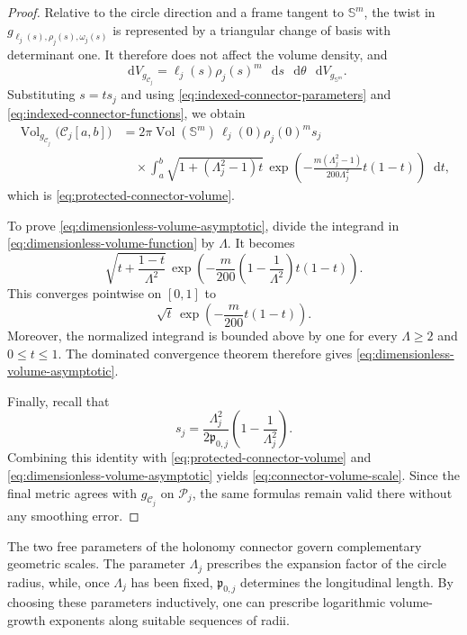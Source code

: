 \documentclass[11pt,reqno]{amsart}
\theoremstyle{definition}
\numberwithin{equation}{section}
\newcommand{\dd}{\mathop{}\!\mathrm d}
\begin{document}
\begin{proof}
Relative to the circle direction and a frame tangent to
$\mathbb S^m$, the twist in
$g_{\ell_j(s),\rho_j(s),\omega_j(s)}$ is represented by a triangular
change of basis with determinant one.  It therefore does not affect the
volume density, and
\[
 \dd V_{g_{\mathcal C_j}}
 =
 \ell_j(s)\rho_j(s)^m\,
 \dd s\,\dd\theta\,\dd V_{g_{\mathbb S^m}}.
\]
Substituting $s=ts_j$ and using
\eqref{eq:indexed-connector-parameters} and
\eqref{eq:indexed-connector-functions}, we obtain
\[
 \begin{aligned}
 \operatorname{Vol}_{g_{\mathcal C_j}}
 \bigl(\mathcal C_j[a,b]\bigr)
 &=
 2\pi\operatorname{Vol}(\mathbb S^m)\,
 \ell_j(0)\rho_j(0)^m s_j\\
 &\quad\times
 \int_a^b
 \sqrt{1+(\Lambda_j^2-1)t}\,
 \exp\left(
   -\frac{m(\Lambda_j^2-1)}{200\Lambda_j^2}t(1-t)
 \right)\dd t,
 \end{aligned}
\]
which is \eqref{eq:protected-connector-volume}.

To prove \eqref{eq:dimensionless-volume-asymptotic}, divide the
integrand in \eqref{eq:dimensionless-volume-function} by $\Lambda$.
It becomes
\[
 \sqrt{
   t+\frac{1-t}{\Lambda^2}
 }\,
 \exp\left(
   -\frac{m}{200}
   \left(1-\frac1{\Lambda^2}\right)t(1-t)
 \right).
\]
This converges pointwise on $[0,1]$ to
\[
 \sqrt t\,
 \exp\left(-\frac{m}{200}t(1-t)\right).
\]
Moreover, the normalized integrand is bounded above by one for every
$\Lambda\ge2$ and $0\le t\le1$.  The dominated convergence theorem
therefore gives
\eqref{eq:dimensionless-volume-asymptotic}.

Finally, recall that
\[
 s_j
 =
 \frac{\Lambda_j^2}{2\mathfrak p_{0,j}}
 \left(1-\frac1{\Lambda_j^2}\right).
\]
Combining this identity with
\eqref{eq:protected-connector-volume} and
\eqref{eq:dimensionless-volume-asymptotic} yields
\eqref{eq:connector-volume-scale}.  Since the final metric agrees with
$g_{\mathcal C_j}$ on $\mathcal P_j$, the same formulas
remain valid there without any smoothing error.
\end{proof}

The two free parameters of the holonomy connector govern complementary geometric
scales.  The parameter \(\Lambda_j\) prescribes the expansion factor of
the circle radius, while, once \(\Lambda_j\) has been fixed,
\(\mathfrak p_{0,j}\) determines the longitudinal length.  By choosing
these parameters inductively, one can prescribe logarithmic
volume-growth exponents along suitable sequences of radii.
\end{document}
